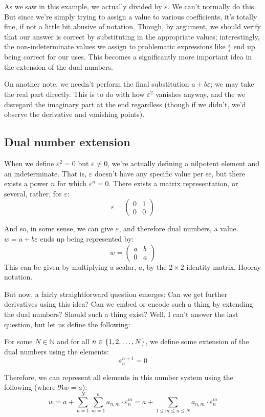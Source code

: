 As we saw in this example, we actually divided by $\varepsilon$. We can't normally do this. But since we're simply trying to assign a value to various coefficients, it's totally fine, if not a little bit abusive of notation. Though, by argument, we should verify that our answer is correct by substituting in the appropriate values; interestingly, the non-indeterminate values we assign to problematic expressions like $\frac{\varepsilon}{\varepsilon}$ end up being correct for our uses. This becomes a significantly more important idea in the extension of the dual numbers.

On another note, we needn't perform the final substitution $a+b\varepsilon$; we may take the real part directly. This is to do with how $\varepsilon^2$ vanishes anyway, and the we disregard the imaginary part at the end regardless (though if we didn't, we'd observe the derivative and vanishing points).

\subsection{Dual number extension}
When we define $\varepsilon^2=0$ but $\varepsilon\neq 0$, we're actually defining a nilpotent element and an indeterminate. That is, $\varepsilon$ doesn't have any specific value per se, but there exists a power $n$ for which $\varepsilon^n=0$. There exists a matrix representation, or several, rather, for $\varepsilon$:
$$
    \varepsilon=\begin{pmatrix}
        0 & 1 \\
        0 & 0
    \end{pmatrix}
$$

And so, in some sense, we can give $\varepsilon$, and therefore dual numbers, a value. $w=a+b\varepsilon$ ends up being represented by:
$$
    w=\begin{pmatrix}
        a & b \\
        0 & a
    \end{pmatrix}
$$
This can be given by multiplying a scalar, $a$, by the $2\times 2$ identity matrix. Hooray notation.

But now, a fairly straightforward question emerges: Can we get further derivatives using this idea? Can we embed or encode such a thing by extending the dual numbers? Should such a thing exist? Well, I can't answer the last question, but let us define the following:

\begin{theorem}
    For some $N\in\mathbb{N}$ and for all $n\in\{1,2,\dots,N\}$, we define some extension of the dual numbers using the elements:
    $$
        \varepsilon_{n}^{n+1}=0
    $$

    Therefore, we can represent all elements in this number system using the following (where $\Re{w}=a$):
    $$
        w=a+\sum_{n=1}^{N}{\sum_{m=1}^{n}{a_{n,m}\cdot\varepsilon_{n}^{m}}}=a+\sum_{1\leq m\leq n\leq N}{a_{n,m}\cdot\varepsilon_{n}^{m}}
    $$
\end{theorem}

